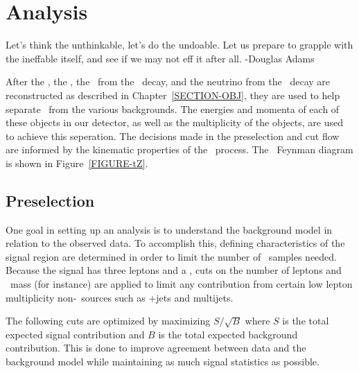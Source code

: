 \chapter{Analysis}
\label{SECTION-ANALYSIS} 

Let's think the unthinkable, let's do the undoable. Let us prepare to grapple with the ineffable itself, and see if we may not eff it after all. -Douglas Adams

\vspace{5mm} %

After the \az, the \at, the \aw~from the \at~decay, and the neutrino from the \aw~decay are reconstructed as described in Chapter~\ref{SECTION-OBJ}, they are used to help separate \tz~from the various backgrounds. The energies and momenta of each of these objects in our detector, as well as the multiplicity of the objects, are used to achieve this seperation. The decisions made in the preselection and cut flow are informed by the kinematic properties of the \tz~process. The \tz~Feynman diagram is shown in Figure~\ref{FIGURE-tZ}. 



\section{Preselection}
\label{SECTION-PRESELECTION}

One goal in setting up an analysis is to understand the background model in relation to the observed data. To accomplish this, defining characteristics of the signal region are determined in order to limit the number of \MC~samples needed. Because the signal has three leptons and a \az, cuts on the number of leptons and \azhyph~mass (for instance) are applied to limit any contribution from certain low lepton multiplicity non-\azhyph~sources such as \aw +jets and multijets. 

The following cuts are optimized by maximizing $S/\sqrt{B}$ where $S$ is the total expected signal contribution and $B$ is the total expected background contribution. This is done to improve agreement between data and the background model while maintaining as much signal statistics as possible. 

